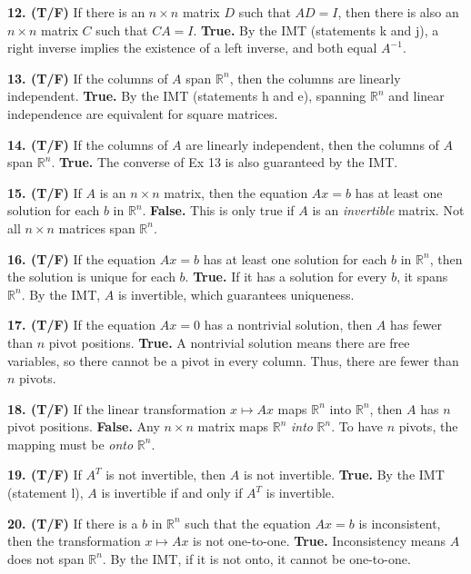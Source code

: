 \documentclass[11pt]{article}
\begin{document}
\textbf{12. (T/F)} If there is an $n \times n$ matrix $D$ such that $AD=I$, then there is also an $n \times n$ matrix $C$ such that $CA=I$.
\textbf{True.} By the IMT (statements k and j), a right inverse implies the existence of a left inverse, and both equal $A^{-1}$.

\textbf{13. (T/F)} If the columns of $A$ span $\mathbb{R}^n$, then the columns are linearly independent.
\textbf{True.} By the IMT (statements h and e), spanning $\mathbb{R}^n$ and linear independence are equivalent for square matrices.

\textbf{14. (T/F)} If the columns of $A$ are linearly independent, then the columns of $A$ span $\mathbb{R}^n$.
\textbf{True.} The converse of Ex 13 is also guaranteed by the IMT.

\textbf{15. (T/F)} If $A$ is an $n \times n$ matrix, then the equation $Ax=b$ has at least one solution for each $b$ in $\mathbb{R}^n$.
\textbf{False.} This is only true if $A$ is an \textit{invertible} matrix. Not all $n \times n$ matrices span $\mathbb{R}^n$.

\textbf{16. (T/F)} If the equation $Ax=b$ has at least one solution for each $b$ in $\mathbb{R}^n$, then the solution is unique for each $b$.
\textbf{True.} If it has a solution for every $b$, it spans $\mathbb{R}^n$. By the IMT, $A$ is invertible, which guarantees uniqueness.

\textbf{17. (T/F)} If the equation $Ax=0$ has a nontrivial solution, then $A$ has fewer than $n$ pivot positions.
\textbf{True.} A nontrivial solution means there are free variables, so there cannot be a pivot in every column. Thus, there are fewer than $n$ pivots.

\textbf{18. (T/F)} If the linear transformation $x \mapsto Ax$ maps $\mathbb{R}^n$ into $\mathbb{R}^n$, then $A$ has $n$ pivot positions.
\textbf{False.} Any $n \times n$ matrix maps $\mathbb{R}^n$ \textit{into} $\mathbb{R}^n$. To have $n$ pivots, the mapping must be \textit{onto} $\mathbb{R}^n$.

\textbf{19. (T/F)} If $A^T$ is not invertible, then $A$ is not invertible.
\textbf{True.} By the IMT (statement l), $A$ is invertible if and only if $A^T$ is invertible.

\textbf{20. (T/F)} If there is a $b$ in $\mathbb{R}^n$ such that the equation $Ax=b$ is inconsistent, then the transformation $x \mapsto Ax$ is not one-to-one.
\textbf{True.} Inconsistency means $A$ does not span $\mathbb{R}^n$. By the IMT, if it is not onto, it cannot be one-to-one.
\end{document}
